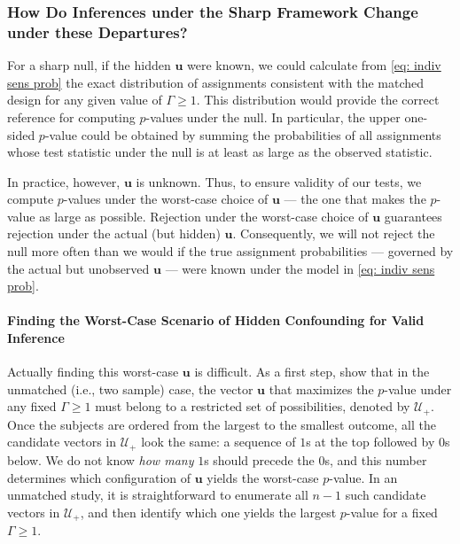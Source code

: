 \documentclass[
  12pt,
  leqno]{article}
\begin{document}
\subsubsection{How Do Inferences under the Sharp Framework Change under
these
Departures?}\label{how-do-inferences-under-the-sharp-framework-change-under-these-departures}

For a sharp null, if the hidden \(\bm{u}\) were known, we could
calculate from \eqref{eq: indiv sens prob} the exact distribution of
assignments consistent with the matched design for any given value of
\(\Gamma \geq 1\). This distribution would provide the correct reference
for computing \(p\)-values under the null. In particular, the upper
one-sided \(p\)-value could be obtained by summing the probabilities of
all assignments whose test statistic under the null is at least as large
as the observed statistic.

In practice, however, \(\bm{u}\) is unknown. Thus, to ensure validity of
our tests, we compute \(p\)-values under the worst-case choice of
\(\bm{u}\) --- the one that makes the \(p\)-value as large as possible.
Rejection under the worst-case choice of \(\bm{u}\) guarantees rejection
under the actual (but hidden) \(\bm{u}\). Consequently, we will not
reject the null more often than we would if the true assignment
probabilities --- governed by the actual but unobserved \(\bm{u}\) ---
were known under the model in \eqref{eq: indiv sens prob}.

\paragraph{Finding the Worst-Case Scenario of Hidden Confounding for
Valid
Inference}\label{finding-the-worst-case-scenario-of-hidden-confounding-for-valid-inference}

Actually finding this worst-case \(\bm{u}\) is difficult. As a first
step, \citet{rosenbaumkrieger1990} show that in the unmatched (i.e., two
sample) case, the vector \(\bm{u}\) that maximizes the \(p\)-value under
any fixed \(\Gamma \geq 1\) must belong to a restricted set of
possibilities, denoted by \(\mathcal{U}_{+}\). Once the subjects are
ordered from the largest to the smallest outcome, all the candidate
vectors in \(\mathcal{U}_{+}\) look the same: a sequence of \(1\)s at
the top followed by \(0\)s below. We do not know \emph{how many} \(1\)s
should precede the \(0\)s, and this number determines which
configuration of \(\bm{u}\) yields the worst-case \(p\)-value. In an
unmatched study, it is straightforward to enumerate all \(n - 1\) such
candidate vectors in \(\mathcal{U}_+\), and then identify which one
yields the largest \(p\)-value for a fixed \(\Gamma \geq 1\).
\end{document}
